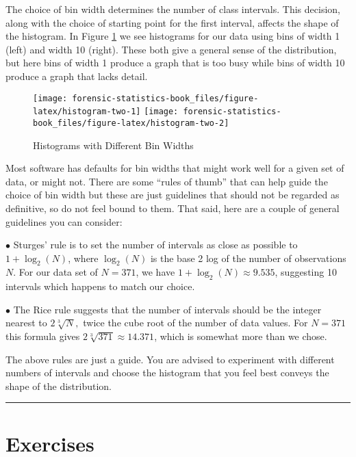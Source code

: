 \documentclass[
]{book}
\begin{document}
The choice of bin width determines the number of class intervals.
This decision, along with the choice of starting point for the first interval,
affects the shape of the histogram. In Figure \ref{fig:histogram-two} we see
histograms for our data using bins of width 1 (left) and width 10 (right).
These both give a general sense of the distribution, but here bins of width 1
produce a graph that is too busy while bins of width 10 produce a graph that
lacks detail.

\begin{figure}
\texttt{[image: forensic-statistics-book\_files/figure-latex/histogram-two-1]} \texttt{[image: forensic-statistics-book\_files/figure-latex/histogram-two-2]} \caption{Histograms with Different Bin Widths}\label{fig:histogram-two}
\end{figure}

Most software has defaults for bin widths that might work well for a given set
of data, or might not. There are some ``rules of thumb'' that can help guide
the choice of bin width but these are just guidelines that should not be
regarded as definitive, so do not feel bound to them. That said, here are
a couple of general guidelines you can consider:

\(\bullet\) Sturges' rule is to set the number of intervals as close as possible to
\(1 + \log_2(N)\), where \(\log_2(N)\) is the base 2 log of the number of
observations \(N\). For our data set of \(N = 371\), we have \(1 + \log_2(N) \approx 9.535\),
suggesting 10 intervals which happens to match our choice.

\(\bullet\) The Rice rule suggests that the number of intervals should be the integer
nearest to \(2\sqrt[3]{N},\) twice the cube root of the number of data values.
For \(N = 371\) this formula gives \(2\sqrt[3]{371} \approx 14.371\), which is somewhat more
than we chose.

The above rules are just a guide. You are advised to experiment with different
numbers of intervals and choose the histogram that you feel best conveys the
shape of the distribution.

\begin{center}\rule{0.5\linewidth}{0.5pt}\end{center}

\hypertarget{exercises-3}{%
\section{Exercises}\label{exercises-3}}
\end{document}
